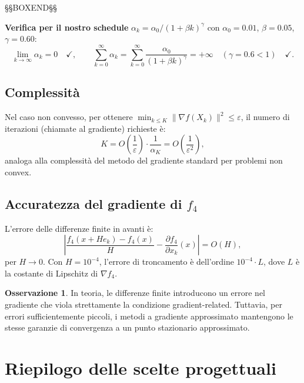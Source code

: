 \documentclass[12pt,a4paper]{article}
\theoremstyle{definition}
\newtheorem{remark}[theorem]{Osservazione}
\newcommand{\grad}{\nabla}
\begin{document}
\noindent §§BOXEND§§



\textbf{Verifica per il nostro schedule} $\alpha_k = \alpha_0 / (1 + \beta k)^\gamma$
con $\alpha_0 = 0.01$, $\beta = 0.05$, $\gamma = 0.60$:
\[
  \lim_{k\to\infty} \alpha_k = 0 \quad\checkmark, \qquad
  \sum_{k=0}^\infty \alpha_k = \sum_{k=0}^\infty \frac{\alpha_0}{(1+\beta k)^\gamma}
  = +\infty \quad (\gamma = 0.6 < 1) \quad\checkmark.
\]

\subsection{Complessità}

Nel caso non convesso, per ottenere $\min_{k \leq K} \|\grad f(X_k)\|^2 \leq \varepsilon$,
il numero di iterazioni (chiamate al gradiente) richieste è:
\[
  K = O\!\left(\frac{1}{\varepsilon}\right) \cdot \frac{1}{\alpha_K} = O\!\left(\frac{1}{\varepsilon^2}\right),
\]
analoga alla complessità del metodo del gradiente standard per problemi non convex.

\subsection{Accuratezza del gradiente di $f_4$}

L'errore delle differenze finite in avanti è:
\[
  \left|\frac{f_4(x + H e_k) - f_4(x)}{H} - \frac{\partial f_4}{\partial x_k}(x)\right|
  = O(H),
\]
per $H \to 0$. Con $H = 10^{-4}$, l'errore di troncamento è dell'ordine $10^{-4} \cdot L$,
dove $L$ è la costante di Lipschitz di $\grad f_4$.

\begin{remark}
In teoria, le differenze finite introducono un errore nel gradiente che viola strettamente
la condizione gradient-related. Tuttavia, per errori sufficientemente piccoli, i metodi
a gradiente approssimato mantengono le stesse garanzie di convergenza a un punto stazionario
approssimato.
\end{remark}

\section{Riepilogo delle scelte progettuali}
\end{document}
